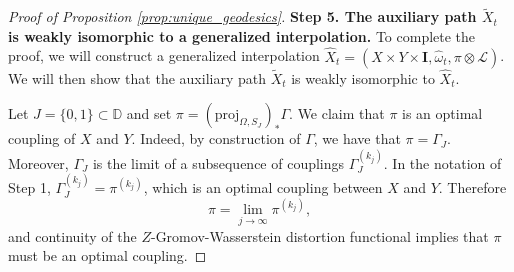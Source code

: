 \documentclass{article}
\theoremstyle{definition}
\begin{document}
\begin{proof}[Proof of Proposition \ref{prop:unique_geodesics}]
    \smallskip
    \noindent \textbf{Step 5. The auxiliary path  $\widetilde{X}_t$ is weakly isomorphic to a generalized interpolation.} To complete the proof, we will construct a generalized interpolation $\widehat{X}_t = (X \times Y \times \mathbf{I}, \hat{\omega}_t, \pi\otimes \mathscr{L})$. We will then show that the auxiliary path $\widetilde{X}_t$ is weakly isomorphic to $\widehat{X}_t$. 
    
    Let $J = \{0,1\} \subset \mathbb{D}$ and set $\pi = (\mathrm{proj}_{\Omega,S_J})_\ast \Gamma$. We claim that $\pi$ is an optimal coupling of $X$ and $Y$. Indeed, by construction of $\Gamma$, we have that $\pi = \Gamma_J$. Moreover, $\Gamma_J$ is the limit of a subsequence of couplings $\Gamma_J^{(k_j)}$. In the notation of Step 1, $\Gamma_J^{(k_j)} = \pi^{(k_j)}$, which is an optimal coupling between $X$ and $Y$. Therefore
    \[
    \pi = \lim_{j \to \infty} \pi^{(k_j)},
    \]
    and continuity of the $Z$-Gromov-Wasserstein distortion functional implies that $\pi$ must be an optimal coupling.


\end{proof}
\end{document}
